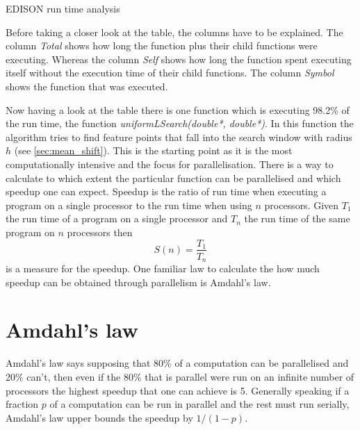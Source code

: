 \begin{table}[ht]
  \centering
  \caption[\protect\Gls{EDISON} run time profile]{ \protect\Gls{EDISON} run time analysis}
  \label{tab:comped}
\end{table}

Before taking a closer look at the table, the columns have to be
explained. The column \emph{Total} shows how long the function plus
their child functions were executing. Whereas the column \emph{Self}
shows how long the function spent executing itself without the
execution time of their child functions. The column \emph{Symbol}
shows the function that was executed.

Now having a look at the table there is one function which is
executing 98.2\% of the run time, the function
\emph{uniformLSearch(double*, double*)}. In this function the
algorithm tries to find feature points that fall into the search
window with radius $h$ (see \autoref{sec:mean_shift}). This is the
starting point as it is the most computationally intensive and the
focus for parallelisation. There is a way to calculate to which extent
the particular function can be parallelised and which speedup one can
expect. Speedup is the ratio of run time when executing a program on a
single processor to the run time when using $n$ processors. Given $T_1$
the run time of a program on a single processor and $T_n$ the run
time of the same program on $n$ processors then
\begin{equation}\label{eq:speedup}
  S(n) = \frac{T_1}{T_n}
\end{equation}
is a measure for the speedup. One familiar law to calculate the how
much speedup can be obtained through parallelism is Amdahl's law.

\section{Amdahl's law}
\label{sec:amdahl_s_law}
Amdahl's law says supposing that 80\% of a computation can be
parallelised and 20\% can't, then even if the 80\% that is parallel
were run on an infinite number of processors the highest speedup that
one can achieve is 5. Generally speaking if a fraction $p$ of a
computation can be run in parallel and the rest must run serially,
Amdahl's law upper bounds the speedup by $1/(1-p)$.

